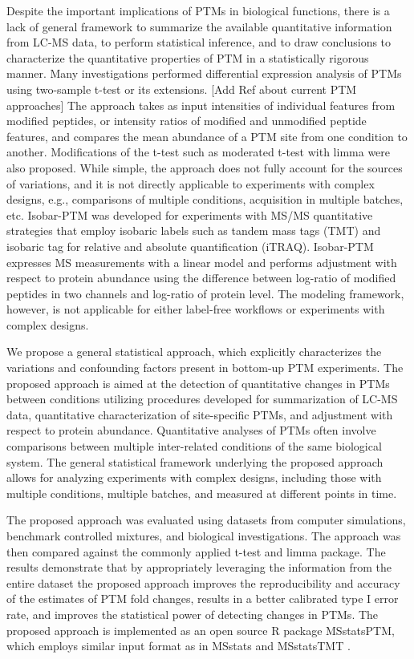 \documentclass[mcp]{article}
\numberwithin{figure}{section} %
\numberwithin{table}{section}
\def\todo#1{{\color{red}[#1]}}
\begin{document}
Despite the important implications of PTMs in biological functions, there is a lack of general framework to summarize the available quantitative information from LC-MS data, to perform statistical inference, and to draw conclusions to characterize the quantitative properties of PTM in a statistically rigorous manner. Many investigations performed differential expression analysis of PTMs using two-sample t-test or its extensions. \todo{Add Ref about current PTM approaches} The approach takes as input intensities of individual features from modified peptides, or intensity ratios of modified and unmodified peptide features, and compares the mean abundance of a PTM site from one condition to another. Modifications of the t-test such as moderated t-test with limma were also proposed.\cite{Zhu} While simple, the approach does not fully account for the sources of variations, and it is not directly applicable to experiments with complex designs, e.g., comparisons of multiple conditions, acquisition in multiple batches, etc. Isobar-PTM was developed for experiments with MS/MS quantitative strategies that employ isobaric labels such as tandem mass tags (TMT) and isobaric tag for relative and absolute quantification (iTRAQ).\cite{Breitwieser:2013} Isobar-PTM expresses MS measurements with a linear model and performs adjustment with respect to protein abundance using the difference between log-ratio of modified peptides in two channels and log-ratio of protein level. The modeling framework, however, is not applicable for either label-free workflows or experiments with complex designs.

We propose a general statistical approach, which explicitly characterizes the variations and confounding factors present in bottom-up PTM experiments. The proposed approach is aimed at the detection of quantitative changes in PTMs between conditions utilizing procedures developed for summarization of LC-MS data, quantitative characterization of site-specific PTMs, and adjustment with respect to protein abundance. Quantitative analyses of PTMs often involve comparisons between multiple inter-related conditions of the same biological system. The general statistical framework underlying the proposed approach allows for analyzing experiments with complex designs, including those with multiple conditions, multiple batches, and measured at different points in time. 

The proposed approach was evaluated using datasets from computer simulations, benchmark controlled mixtures, and biological investigations. The approach was then compared against the commonly applied t-test and limma package. The results demonstrate that by appropriately leveraging the information from the entire dataset the proposed approach improves the reproducibility and accuracy of the estimates of PTM fold changes, results in a better calibrated type I error rate, and improves the statistical power of detecting changes in PTMs. The proposed approach is implemented as an open source R package MSstatsPTM, which employs similar input format as in MSstats and MSstatsTMT \cite{Choi:2014} \cite{Huang:2020}.
\end{document}
